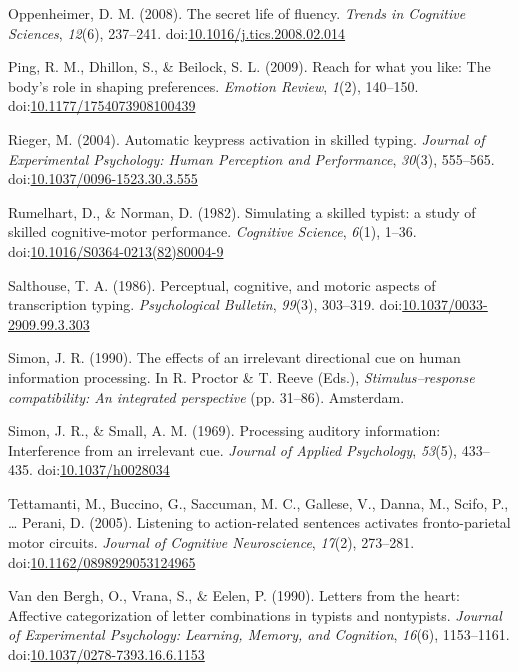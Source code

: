 \documentclass[english,man]{apa6}
\theoremstyle{definition}
\theoremstyle{definition}
\theoremstyle{definition}
\theoremstyle{remark}
\begin{document}
\hypertarget{ref-Oppenheimer2008}{}
Oppenheimer, D. M. (2008). The secret life of fluency. \emph{Trends in
Cognitive Sciences}, \emph{12}(6), 237--241.
doi:\href{https://doi.org/10.1016/j.tics.2008.02.014}{10.1016/j.tics.2008.02.014}

\hypertarget{ref-Ping2009}{}
Ping, R. M., Dhillon, S., \& Beilock, S. L. (2009). Reach for what you
like: The body's role in shaping preferences. \emph{Emotion Review},
\emph{1}(2), 140--150.
doi:\href{https://doi.org/10.1177/1754073908100439}{10.1177/1754073908100439}

\hypertarget{ref-Rieger2004}{}
Rieger, M. (2004). Automatic keypress activation in skilled typing.
\emph{Journal of Experimental Psychology: Human Perception and
Performance}, \emph{30}(3), 555--565.
doi:\href{https://doi.org/10.1037/0096-1523.30.3.555}{10.1037/0096-1523.30.3.555}

\hypertarget{ref-Rumelhart1982}{}
Rumelhart, D., \& Norman, D. (1982). Simulating a skilled typist: a
study of skilled cognitive-motor performance. \emph{Cognitive Science},
\emph{6}(1), 1--36.
doi:\href{https://doi.org/10.1016/S0364-0213(82)80004-9}{10.1016/S0364-0213(82)80004-9}

\hypertarget{ref-Salthouse1986}{}
Salthouse, T. A. (1986). Perceptual, cognitive, and motoric aspects of
transcription typing. \emph{Psychological Bulletin}, \emph{99}(3),
303--319.
doi:\href{https://doi.org/10.1037/0033-2909.99.3.303}{10.1037/0033-2909.99.3.303}

\hypertarget{ref-Simon1990}{}
Simon, J. R. (1990). The effects of an irrelevant directional cue on
human information processing. In R. Proctor \& T. Reeve (Eds.),
\emph{Stimulus--response compatibility: An integrated perspective} (pp.
31--86). Amsterdam.

\hypertarget{ref-Simon1969}{}
Simon, J. R., \& Small, A. M. (1969). Processing auditory information:
Interference from an irrelevant cue. \emph{Journal of Applied
Psychology}, \emph{53}(5), 433--435.
doi:\href{https://doi.org/10.1037/h0028034}{10.1037/h0028034}

\hypertarget{ref-Tettamanti2005}{}
Tettamanti, M., Buccino, G., Saccuman, M. C., Gallese, V., Danna, M.,
Scifo, P., \ldots{} Perani, D. (2005). Listening to action-related
sentences activates fronto-parietal motor circuits. \emph{Journal of
Cognitive Neuroscience}, \emph{17}(2), 273--281.
doi:\href{https://doi.org/10.1162/0898929053124965}{10.1162/0898929053124965}

\hypertarget{ref-VandenBergh1990}{}
Van den Bergh, O., Vrana, S., \& Eelen, P. (1990). Letters from the
heart: Affective categorization of letter combinations in typists and
nontypists. \emph{Journal of Experimental Psychology: Learning, Memory,
and Cognition}, \emph{16}(6), 1153--1161.
doi:\href{https://doi.org/10.1037/0278-7393.16.6.1153}{10.1037/0278-7393.16.6.1153}
\end{document}
